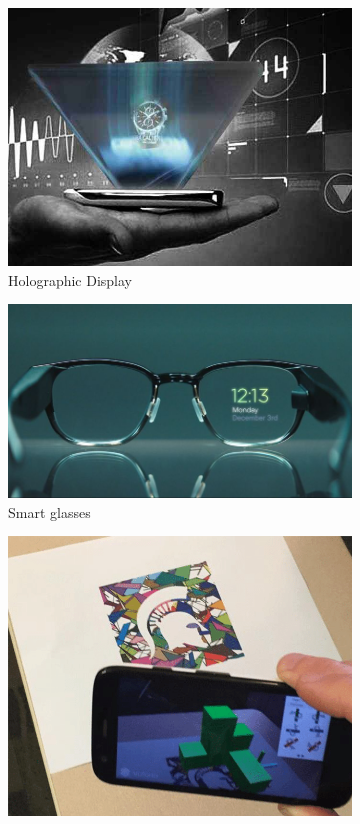 \documentclass[12 pct]{report}
\begin{document}
\begin{figure}[h!]
\begin{subfigure}[b]{0.4\linewidth}
    \includegraphics[width=\linewidth]{holographic-display}
    \caption{Holographic Display}
  \end{subfigure}
  \begin{subfigure}[b]{0.4\linewidth}
    \includegraphics[width=\linewidth]{smart-glasses}
    \caption{Smart glasses}
  \end{subfigure}
  \begin{subfigure}[b]{0.4\linewidth}
    \includegraphics[width=\linewidth]{hand-held}

\end{subfigure}
\end{figure}
\end{document}
